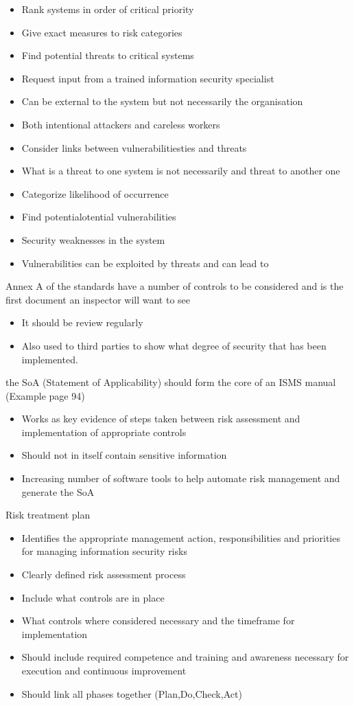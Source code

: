\begin{itemize}
   \item Rank systems in order of critical priority
   \item Give exact measures to risk categories
   \item Find potential threats to critical systems 
   \item Request input from a trained information security specialist
   \item Can be external to the system but not necessarily the organisation
   \item Both intentional attackers and careless workers
   \item Consider links between vulnerabilitiesties and threats
   \item What is a threat to one system is not necessarily and threat to another one
   \item Categorize likelihood of occurrence 
   \item Find potentialotential vulnerabilities
   \item Security weaknesses in the system
   \item Vulnerabilities can be exploited by threats and can lead to 
\end{itemize}
Annex A of the standards have a number of controls to be considered and is the first document an inspector will want to see
\begin{itemize}
   \item It should be review regularly
   \item Also used to third parties to show what degree of security that has been implemented.
\end{itemize}
the SoA (Statement of Applicability) should form the core of an ISMS manual (Example page 94)
\begin{itemize}
   \item Works as key evidence of steps taken between risk assessment and implementation of appropriate controls
   \item Should not in itself contain sensitive information
   \item Increasing number of software tools to help automate risk management and generate the SoA
\end{itemize}
    Risk treatment plan
\begin{itemize}
   \item Identifies the appropriate management action, responsibilities and priorities for managing information security risks
   \item Clearly defined risk assessment process
   \item Include what controls are in place
   \item What controls where considered necessary and the timeframe for implementation
   \item Should include required competence and training and awareness necessary for execution and continuous improvement
   \item Should link all phases together (Plan,Do,Check,Act)
\end{itemize}
